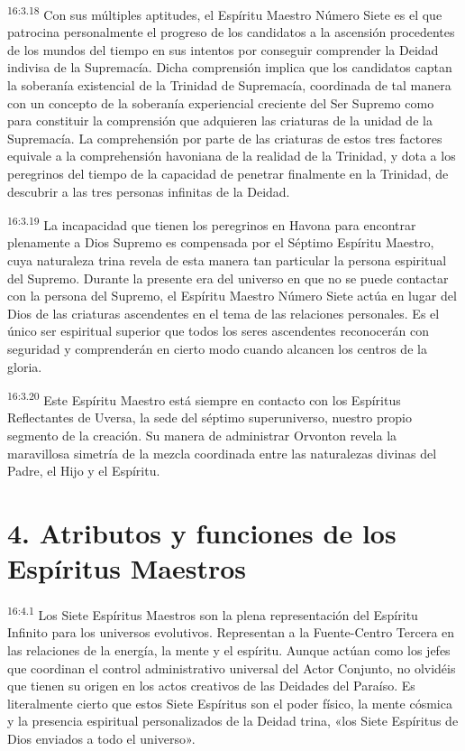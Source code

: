 \par
\textsuperscript{16:3.18} Con sus múltiples aptitudes, el Espíritu Maestro Número Siete es el que patrocina personalmente el progreso de los candidatos a la ascensión procedentes de los mundos del tiempo en sus intentos por conseguir comprender la Deidad indivisa de la Supremacía. Dicha comprensión implica que los candidatos captan la soberanía existencial de la Trinidad de Supremacía, coordinada de tal manera con un concepto de la soberanía experiencial creciente del Ser Supremo como para constituir la comprensión que adquieren las criaturas de la unidad de la Supremacía. La comprehensión por parte de las criaturas de estos tres factores equivale a la comprehensión havoniana de la realidad de la Trinidad, y dota a los peregrinos del tiempo de la capacidad de penetrar finalmente en la Trinidad, de descubrir a las tres personas infinitas de la Deidad.

\par
\textsuperscript{16:3.19} La incapacidad que tienen los peregrinos en Havona para encontrar plenamente a Dios Supremo es compensada por el Séptimo Espíritu Maestro, cuya naturaleza trina revela de esta manera tan particular la persona espiritual del Supremo. Durante la presente era del universo en que no se puede contactar con la persona del Supremo, el Espíritu Maestro Número Siete actúa en lugar del Dios de las criaturas ascendentes en el tema de las relaciones personales. Es el único ser espiritual superior que todos los seres ascendentes reconocerán con seguridad y comprenderán en cierto modo cuando alcancen los centros de la gloria.

\par
\textsuperscript{16:3.20} Este Espíritu Maestro está siempre en contacto con los Espíritus Reflectantes de Uversa, la sede del séptimo superuniverso, nuestro propio segmento de la creación. Su manera de administrar Orvonton revela la maravillosa simetría de la mezcla coordinada entre las naturalezas divinas del Padre, el Hijo y el Espíritu.

\section*{4. Atributos y funciones de los Espíritus Maestros}
\par
\textsuperscript{16:4.1} Los Siete Espíritus Maestros son la plena representación del Espíritu Infinito para los universos evolutivos. Representan a la Fuente-Centro Tercera en las relaciones de la energía, la mente y el espíritu. Aunque actúan como los jefes que coordinan el control administrativo universal del Actor Conjunto, no olvidéis que tienen su origen en los actos creativos de las Deidades del Paraíso. Es literalmente cierto que estos Siete Espíritus son el poder físico, la mente cósmica y la presencia espiritual personalizados de la Deidad trina, «los Siete Espíritus de Dios enviados a todo el universo».

